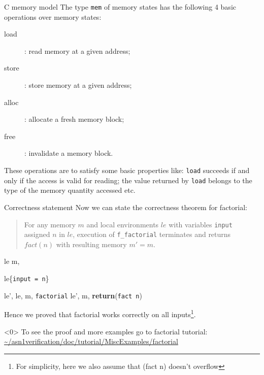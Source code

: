 \documentclass[10pt]{beamer}
\begin{document}
\begin{frame}{C memory model}
  The type \texttt{mem} of memory states has  the following 4 basic operations over memory states:
  \bigskip
\begin{description}
\item [load]: read memory at a given address;
\item [store]: store memory at a given address;
\item [alloc]: allocate a fresh memory block;
\item [free]: invalidate a memory block.
\end{description}
These operations are to satisfy some basic properties like:  \texttt{load} succeeds if and only if the access is valid for reading; the value returned by \texttt{load} belongs to the type of the memory quantity accessed etc. 

\end{frame}

 \begin{frame}{Correctness statement}
    Now we can state the correctness theorem for factorial:
    
    
   \begin{quote}
     For any memory $m$ and local environments $le$ with variables \texttt{input} assigned $n$ in $le$, execution of \texttt{f\_factorial} terminates and returns $fact(n)$ with resulting memory $m' = m$.
   \end{quote}
   
   \begin{theorem} \forall le \; m, 
    
    le\{\texttt{input = n}\} \rightarrow 
    
    \exists le', le, m, \texttt{factorial} \Rightarrow  le', m,  {\bf return}(\texttt{fact n})    
    \end{theorem}

   Hence we proved that factorial works correctly on all inputs\footnote{For simplicity, here we also assume that (fact n) doesn't overflow}.
      
      \end{frame}
    

    
    \begin{frame}<0>
      To see the proof and more examples go to factorial tutorial: \url{~/asn1verification/doc/tutorial/MiscExamples/factorial}
    \end{frame}
\end{document}
